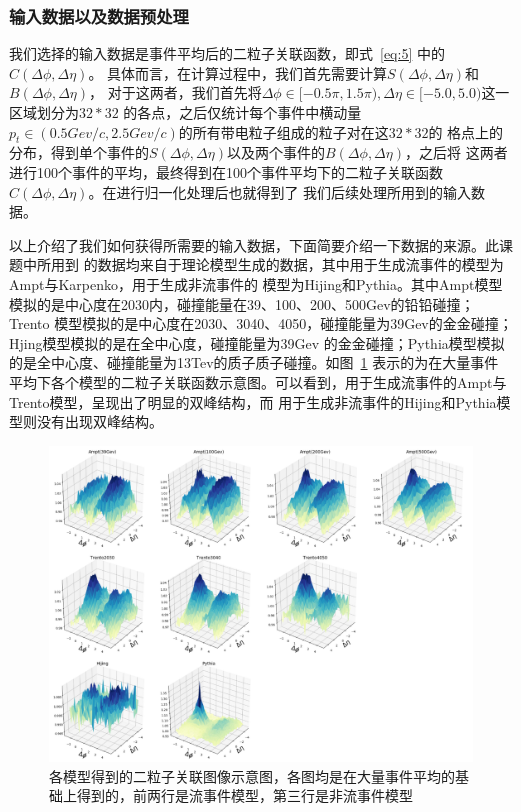 \documentclass[aps,pre,12pt,preprint,onecolumn,showpacs,showkeys]{revtex4-1}
\begin{document}
\subsubsection{输入数据以及数据预处理}
我们选择的输入数据是事件平均后的二粒子关联函数，即式~\ref{eq:5} 中的$C(\Delta\phi,\Delta\eta)$。
具体而言，在计算过程中，我们首先需要计算$S(\Delta\phi,\Delta\eta)$和$B(\Delta\phi,\Delta\eta)$，
对于这两者，我们首先将$\Delta\phi\in[-0.5\pi,1.5\pi),\Delta\eta\in[-5.0,5.0)$这一区域划分为$32*32$
的各点，之后仅统计每个事件中横动量$p_{t}\in(0.5Gev/c,2.5Gev/c)$的所有带电粒子组成的粒子对在这$32*32$的
格点上的分布\cite{PhysRevC.89.064910}，得到单个事件的$S(\Delta\phi,\Delta\eta)$以及两个事件的$B(\Delta\phi,\Delta\eta)$，之后将
这两者进行100个事件的平均，最终得到在100个事件平均下的二粒子关联函数$C(\Delta\phi,\Delta\eta)$。在进行归一化处理后也就得到了
我们后续处理所用到的输入数据。\par
以上介绍了我们如何获得所需要的输入数据，下面简要介绍一下数据的来源。此课题中所用到
的数据均来自于理论模型生成的数据，其中用于生成流事件的模型为Ampt与Karpenko，用于生成非流事件的
模型为Hijing和Pythia。其中Ampt模型模拟\cite{PhysRevC.72.064901}的是中心度在2030内，碰撞能量在39、100、200、500Gev的铅铅碰撞；Trento
模型模拟的是中心度在2030、3040、4050，碰撞能量为39Gev的金金碰撞；Hjing模型\cite{PhysRevD.44.3501}模拟的是在全中心度，碰撞能量为39Gev
的金金碰撞；Pythia模型模拟的是全中心度、碰撞能量为13Tev的质子质子碰撞。如图~\ref{fig:sample} 表示的为在大量事件
平均下各个模型的二粒子关联函数示意图。可以看到，用于生成流事件的Ampt与Trento模型，呈现出了明显的双峰结构，而
用于生成非流事件的Hijing和Pythia模型则没有出现双峰结构。
\begin{figure}[t]
\centering
\includegraphics[width=140mm]{sample}
\caption{\label{fig:sample}%
各模型得到的二粒子关联图像示意图，各图均是在大量事件平均的基础上得到的，前两行是流事件模型，第三行是非流事件模型}
\end{figure}
\end{document}

